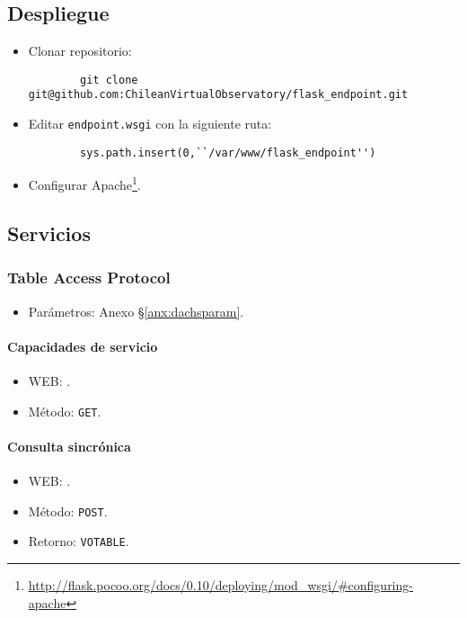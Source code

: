 \subsection*{Despliegue}

\begin{itemize}
	\item Clonar repositorio:
		\begin{verbatim}
		git clone git@github.com:ChileanVirtualObservatory/flask_endpoint.git
	\end{verbatim}
	\item Editar \verb;endpoint.wsgi; con la siguiente ruta:
		\begin{verbatim}
		sys.path.insert(0,``/var/www/flask_endpoint'')
	\end{verbatim}
	\item Configurar Apache\footnote{\url{http://flask.pocoo.org/docs/0.10/deploying/mod\_wsgi/\#configuring-apache}}.
\end{itemize}

\subsection*{Servicios}

\subsubsection*{{\sc Table Access Protocol}}

\begin{itemize}
	\item Parámetros: Anexo \S\ref{anx:dachsparam}.
\end{itemize}

\paragraph{Capacidades de servicio}

\begin{itemize}
	\item WEB: \url{}.
	\item M\'etodo: \verb;GET;.
\end{itemize}

\paragraph{Consulta sincrónica}

\begin{itemize}
	\item WEB: \url{}.
	\item M\'etodo: \verb;POST;.
	\item Retorno: \verb;VOTABLE;.
\end{itemize}

